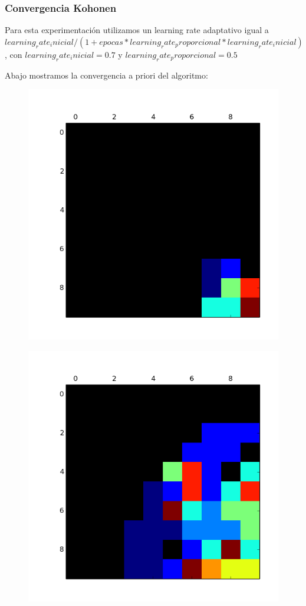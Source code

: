 \subsubsection{Convergencia Kohonen}

Para esta experimentación utilizamos un learning rate adaptativo igual a $learning_rate_inicial / (1 + epocas * learning_rate_proporcional * learning_rate_inicial)$, con $learning_rate_inicial=0.7$  y $learning_rate_proporcional=0.5$

Abajo mostramos la convergencia a priori del algoritmo:

\begin{figure}[h!]
\centering
\begin{minipage}{.15\textwidth}
  \centering
  \includegraphics[width=.9\linewidth]{convergencia_kohonen/entrenamiento_0.png}
  \label{fig:test1}
\end{minipage}%
\begin{minipage}{.15\textwidth}
  \centering
  \includegraphics[width=.9\linewidth]{convergencia_kohonen/entrenamiento_25.png}

\end{minipage}
\end{figure}

